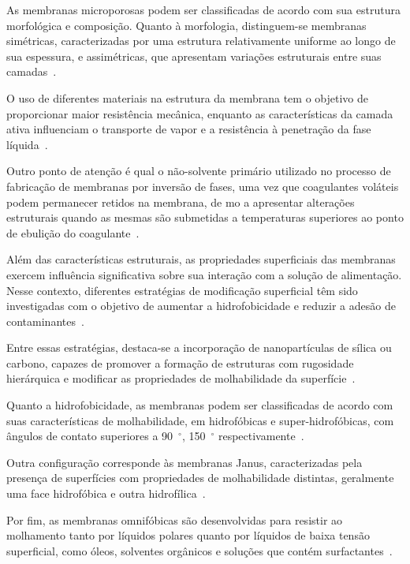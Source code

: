 As membranas microporosas podem ser classificadas de acordo com sua estrutura morfológica e composição. Quanto à morfologia, distinguem-se membranas simétricas, caracterizadas por uma estrutura relativamente uniforme ao longo de sua espessura, e assimétricas, que apresentam variações estruturais entre suas camadas~\cite{mulder1996,habert_psm,Parani2021}.

O uso de diferentes materiais na estrutura da membrana tem o objetivo de proporcionar maior resistência mecânica, enquanto as características da camada ativa influenciam o transporte de vapor e a resistência à penetração da fase líquida~\cite{mulder1996,habert_psm,Parani2021}. 

Outro ponto de atenção é qual o não-solvente primário utilizado no processo de fabricação de membranas por inversão de fases, uma vez que coagulantes voláteis podem permanecer retidos na membrana, de mo a apresentar alterações estruturais quando as mesmas são submetidas a temperaturas superiores ao ponto de ebulição do coagulante~\cite{Nguyen2025MDStability}.

Além das características estruturais, as propriedades superficiais das membranas exercem influência significativa sobre sua interação com a solução de alimentação. Nesse contexto, diferentes estratégias de modificação superficial têm sido investigadas com o objetivo de aumentar a hidrofobicidade e reduzir a adesão de contaminantes~\cite{mulder1996,habert_psm,Parani2021}.

Entre essas estratégias, destaca-se a incorporação de nanopartículas de sílica ou carbono, capazes de promover a formação de estruturas com rugosidade hierárquica e modificar as propriedades de molhabilidade da superfície~\cite{Laqbaqbi2017,Gong2019}. 

Quanto a hidrofobicidade, as membranas podem ser classificadas de acordo com suas características de molhabilidade, em hidrofóbicas e super-hidrofóbicas, com ângulos de contato superiores a 90~$^\circ$, 150~$^\circ$ respectivamente~\cite{Khan2025Fluoropolymer,Yeszhanov2021}. 

Outra configuração corresponde às membranas Janus, caracterizadas pela presença de superfícies com propriedades de molhabilidade distintas, geralmente uma face hidrofóbica e outra hidrofílica~\cite{Yeszhanov2021,Khan2025Fluoropolymer}. 

Por fim, as membranas omnifóbicas são desenvolvidas para resistir ao molhamento tanto por líquidos polares quanto por líquidos de baixa tensão superficial, como óleos, solventes orgânicos e soluções que contém surfactantes~\cite{Prasanna2023Omniphobic,Khan2025Fluoropolymer}.

